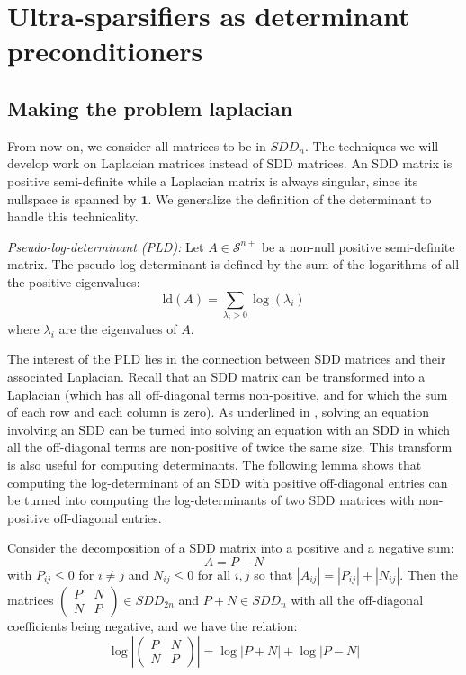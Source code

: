 
\section{Ultra-sparsifiers as determinant preconditioners}


\subsection{Making the problem laplacian}

\label{sec:Making-the-problem}

From now on, we consider all matrices to be in $SDD_{n}$. The techniques
we will develop work on Laplacian matrices instead of SDD matrices.
An SDD matrix is positive semi-definite while a Laplacian matrix is
always singular, since its nullspace is spanned by $\mathbf{1}$.
We generalize the definition of the determinant to handle this technicality. 

\begin{definition} \emph{Pseudo-log-determinant (PLD):} Let $A\in\mathcal{S}^{n+}$
be a non-null positive semi-definite matrix. The pseudo-log-determinant
is defined by the sum of the logarithms of all the positive eigenvalues:
\[
\text{ld}\left(A\right)=\sum_{\lambda_{i}>0}\log\left(\lambda_{i}\right)
\]
where $\lambda_{i}$ are the eigenvalues of $A$. \end{definition}

The interest of the PLD lies in the connection between SDD matrices
and their associated Laplacian. Recall that an SDD matrix can be transformed
into a Laplacian (which has all off-diagonal terms non-positive, and
for which the sum of each row and each column is zero). As underlined
in \cite{Gremban1996}, solving an equation involving an SDD can be
turned into solving an equation with an SDD in which all the off-diagonal
terms are non-positive of twice the same size. This transform is also
useful for computing determinants. The following lemma shows that
computing the log-determinant of an SDD with positive off-diagonal
entries can be turned into computing the log-determinants of two SDD
matrices with non-positive off-diagonal entries.

\begin{lemma}\label{non-negative-conversion}Consider the decomposition
of a SDD matrix into a positive and a negative sum:
\[
A=P-N
\]
with $P_{ij}\leq0$ for $i\neq j$ and $N_{ij}\leq0$ for all $i,j$
so that $\left|A_{ij}\right|=\left|P_{ij}\right|+\left|N_{ij}\right|$.
Then the matrices $\left(\begin{array}{cc}
P & N\\
N & P
\end{array}\right)\in SDD_{2n}$ and $P+N\in SDD_{n}$ with all the off-diagonal coefficients being
negative, and we have the relation:
\[
\log\left|\left(\begin{array}{cc}
P & N\\
N & P
\end{array}\right)\right|=\log\left|P+N\right|+\log\left|P-N\right|
\]


\end{lemma}

